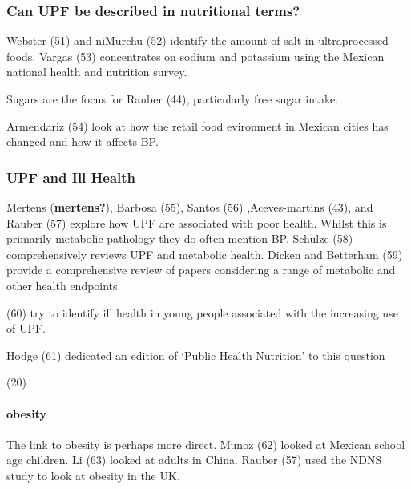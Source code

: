\documentclass[
]{article}
\begin{document}
\hypertarget{can-upf-be-described-in-nutritional-terms}{%
\subsubsection{Can UPF be described in nutritional
terms?}\label{can-upf-be-described-in-nutritional-terms}}

Webster (51) and niMurchu (52) identify the amount of salt in
ultraprocessed foods. Vargas (53) concentrates on sodium and potassium
using the Mexican national health and nutrition survey.

Sugars are the focus for Rauber (44), particularly free sugar intake.

Armendariz (54) look at how the retail food evironment in Mexican cities
has changed and how it affects BP.

\hypertarget{section}{%
\subsubsection{}\label{section}}

\hypertarget{upf-and-ill-health}{%
\subsubsection{UPF and Ill Health}\label{upf-and-ill-health}}

Mertens (\textbf{mertens?}), Barbosa (55), Santos (56) ,Aceves-martins
(43), and Rauber (57) explore how UPF are associated with poor health.
Whilst this is primarily metabolic pathology they do often mention BP.
Schulze (58) comprehensively reviews UPF and metabolic health. Dicken
and Betterham (59) provide a comprehensive review of papers considering
a range of metabolic and other health endpoints.

(60) try to identify ill health in young people associated with the
increasing use of UPF.

Hodge (61) dedicated an edition of `Public Health Nutrition' to this
question

(20)

\hypertarget{obesity}{%
\paragraph{obesity}\label{obesity}}

The link to obesity is perhaps more direct. Munoz (62) looked at Mexican
school age children. Li (63) looked at adults in China. Rauber (57) used
the NDNS study to look at obesity in the UK.
\end{document}
